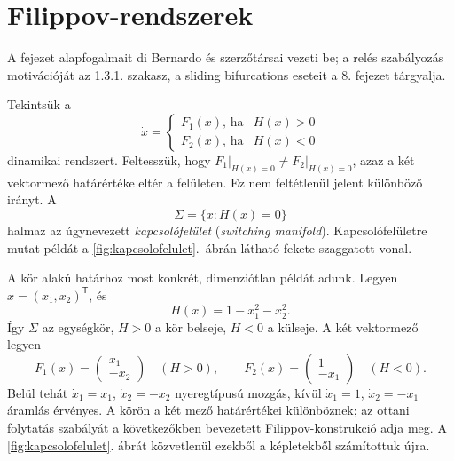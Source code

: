 \chapter{\label{sec:filippov}Filippov-rendszerek}
A fejezet alapfogalmait di Bernardo és szerzőtársai \cite[2.2.3. szakasz]{dib} vezeti be; a relés szabályozás motivációját az 1.3.1. szakasz, a sliding bifurcations eseteit a 8. fejezet tárgyalja.


Tekintsük a
\begin{equation}
\dot{x}=\left\{
\begin{matrix}
F_1(x), \, \mathrm{ha} & H(x) > 0\\
F_2(x), \, \mathrm{ha} & H(x) < 0
\end{matrix}
\right.
\end{equation}
\noindent dinamikai rendszert. Feltesszük, hogy
$\left.F_1\right|_{H(x)=0} \neq \left.F_2\right|_{H(x)=0}$,
azaz a két vektormező határértéke eltér a felületen. Ez nem feltétlenül jelent különböző irányt. A
\begin{equation}
\Sigma=\{x:H(x)=0\}
\end{equation}
\noindent halmaz az úgynevezett \emph{kapcsolófelület}  (\textit{switching manifold}). Kapcsolófelületre mutat példát a \ref{fig:kapcsolofelulet}.~ábrán látható fekete szaggatott vonal.

A kör alakú határhoz most konkrét, dimenziótlan példát adunk. Legyen $x=(x_1,x_2)^\mathsf T$, és
\begin{equation}\label{eq:circle_switch_H}
H(x)=1-x_1^2-x_2^2.
\end{equation}
Így $\Sigma$ az egységkör, $H>0$ a kör belseje, $H<0$ a külseje. A két vektormező legyen
\begin{equation}\label{eq:circle_switch_fields}
F_1(x)=\begin{pmatrix}x_1\\-x_2\end{pmatrix}\quad(H>0),\qquad
F_2(x)=\begin{pmatrix}1\\-x_1\end{pmatrix}\quad(H<0).
\end{equation}
Belül tehát $\dot x_1=x_1$, $\dot x_2=-x_2$ nyeregtípusú mozgás, kívül $\dot x_1=1$, $\dot x_2=-x_1$ áramlás érvényes. A körön a két mező határértékei különböznek; az ottani folytatás szabályát a következőkben bevezetett Filippov-konstrukció adja meg. A \ref{fig:kapcsolofelulet}. ábrát közvetlenül ezekből a képletekből számítottuk újra.

